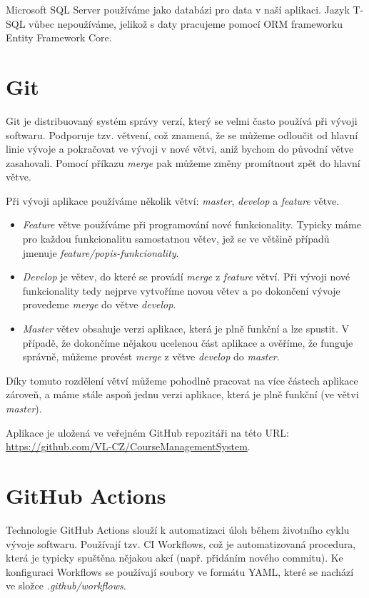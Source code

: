 Microsoft SQL Server používáme jako databázi pro data v naší aplikaci. Jazyk T-SQL vůbec nepoužíváme, jelikož s daty pracujeme pomocí ORM frameworku Entity Framework Core.

\section{Git}
Git je distribuovaný systém správy verzí, který se velmi často používá při vývoji softwaru. Podporuje tzv. větvení, což znamená, že se můžeme odloučit od hlavní linie vývoje a pokračovat ve vývoji v nové větvi, aniž bychom do původní větve zasahovali. Pomocí příkazu \textit{merge} pak můžeme změny promítnout zpět do hlavní větve.
\cite{GitDocs}

Při vývoji aplikace používáme několik větví: \textit{master}, \textit{develop} a \textit{feature} větve.
\begin{itemize}
	\item \textit{Feature} větve používáme při programování nové funkcionality. Typicky má\-me pro každou funkcionalitu samostatnou větev, jež se ve většině případů jmenuje \textit{feature/popis-funkcionality}.
	\item \textit{Develop} je větev, do které se provádí \textit{merge} z \textit{feature} větví. Při vývoji nové funkcionality tedy nejprve vytvoříme novou větev a po dokončení vývoje provedeme \textit{merge} do větve \textit{develop}.
	\item \textit{Master} větev obsahuje verzi aplikace, která je plně funkční a lze spustit. V případě, že dokončíme nějakou ucelenou část aplikace a ověříme, že funguje správně, můžeme provést \textit{merge} z větve \textit{develop} do \textit{master}.
\end{itemize}
Díky tomuto rozdělení větví můžeme pohodlně pracovat na více částech aplikace zároveň, a máme stále aspoň jednu verzi aplikace, která je plně funkční (ve větvi \textit{master}).

Aplikace je uložená ve veřejném GitHub repozitáři na této URL: \url{https://github.com/VL-CZ/CourseManagementSystem}.

\section{GitHub Actions}
Technologie GitHub Actions slouží k automatizaci úloh během životního cyklu vývoje softwaru. Používají tzv. CI Workflows, což je automatizovaná procedura, která je typicky spuštěna nějakou akcí (např. přidáním nového commitu).
Ke konfiguraci Workflows se používají soubory ve formátu YAML, které se nachází ve složce \textit{.github/workflows}.
\cite{GitHubActionsDocs}

